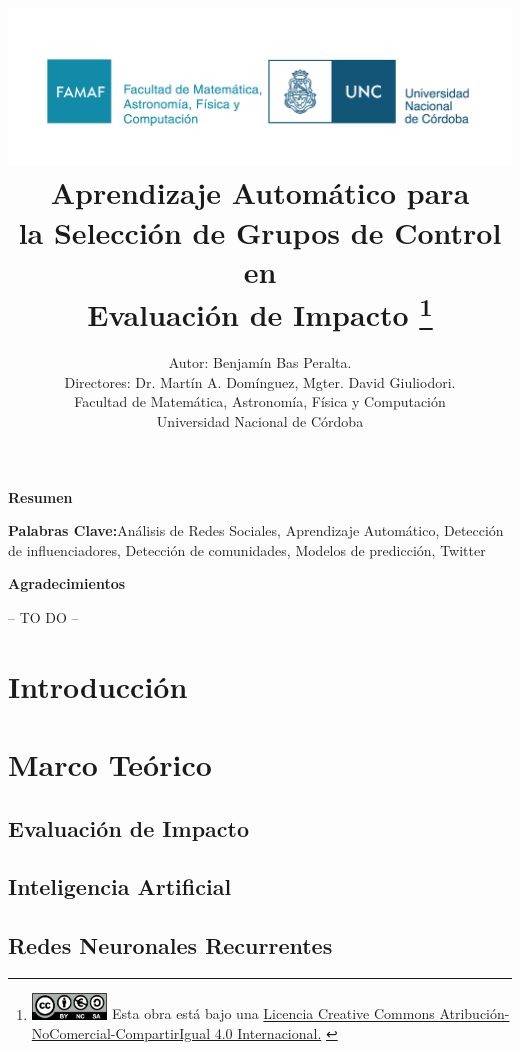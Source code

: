 \documentclass[a4paper,12pt,spanish]{book}
\title{
    \vspace{-5cm}
    \includegraphics[scale=.25]{logos/FAMAF_UNC.png} \\
    Aprendizaje Automático para \\
    la Selección de Grupos de Control en \\
    Evaluación de Impacto
    \thanks{
        {
        {\protect\includegraphics[height=7mm]{logos/creative-commons.png}} \fontsize{10}{11}\selectfont  Esta obra está bajo una \href{https://creativecommons.org/licenses/by-nc-sa/4.0/}{Licencia Creative Commons Atribución-NoComercial-CompartirIgual 4.0 Internacional.}
        }
    }
}
\author{
    Autor: Benjam\'in Bas Peralta.\\
    Directores: Dr. Martín A. Domínguez, Mgter. David Giuliodori.\\ 
    Facultad de Matemática, Astronomía, Física y Computación\\
    Universidad Nacional de Córdoba
}
\begin{document}
\maketitle

\cleardoublepage

\begin{center}
\textbf{Resumen}

\end{center}



\smallskip
\vspace{2cm}


\smallskip
\vspace{2cm}

\textbf{Palabras Clave:}Análisis de Redes Sociales, Aprendizaje Automático, Detección de influenciadores, Detección de comunidades, Modelos de predicción, Twitter
\\

\cleardoublepage


\thispagestyle{empty}
\phantom{a}
\vfill
\newpage
\vfill
\noindent\textbf{\Large Agradecimientos}

-- TO DO --


\bigskip

\smallskip
\tableofcontents
\cleardoublepage

\chapter{Introducción}



\chapter{Marco Teórico}

\section{Evaluación de Impacto}


\section{Inteligencia Artificial}


\section{Redes Neuronales Recurrentes}

\end{document}
